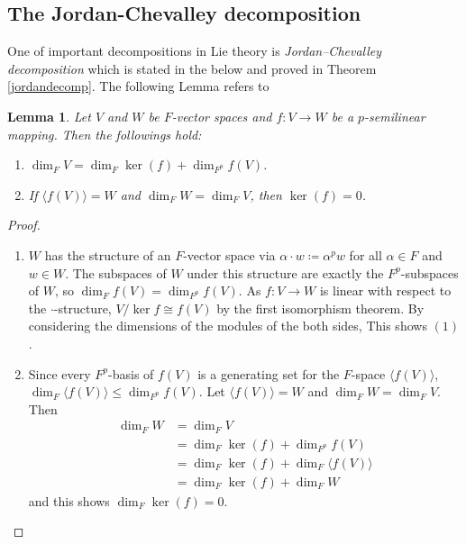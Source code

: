 \documentclass[12pt,MSc]{muthesis_2023}
\theoremstyle{plain}%
\newtheorem{Lemma}[FactCounter]{Lemma} %
\theoremstyle{definition}
\theoremstyle{remark}
\begin{document}
\subsection{The Jordan-Chevalley decomposition}

One of important decompositions in Lie theory is \textit{Jordan–Chevalley decomposition} which is stated in the below and proved in Theorem \ref{jordandecomp}. The following Lemma refers to  \cite[Lemma 2.3.1]{SF}

\begin{Lemma}\label{kerf=0}
Let $V$ and $W$ be $F$-vector spaces and $f:V\rightarrow W$ be a $p$-semilinear mapping. Then the followings hold:
\begin{enumerate}
\item[(1)]
$\dim_F V=\dim_F \ker(f) +\dim_{F^p} f(V)$.
\item[(2)]
If $\langle f(V) \rangle =W$ and $\dim_F W=\dim_F V$, then $\ker(f)=0$.
\end{enumerate}
\end{Lemma}

\begin{proof}
\begin{enumerate}
\item[(1)]
$W$ has the structure of an $F$-vector space via $\alpha \cdot w \coloneqq \alpha^p w$ for all $\alpha\in F$ and $w\in W$. The subspaces of $W$ under this structure are exactly the $F^p$-subspaces of $W$, so $\dim_F f(V)=\dim_{F^p} f(V)$. As $f:V \rightarrow W$ is linear with respect to the $\cdot$-structure, $V/\ker f \cong f(V)$ by the first isomorphism theorem. By considering the dimensions of the modules of the both sides, This shows $(1)$.

\item[(2)]
Since every $F^p$-basis of $f(V)$ is a generating set for the $F$-space $\langle f(V)\rangle$, $\dim_F\langle f(V)\rangle \leq \dim_{F^p} f(V)$. Let $\langle f(V) \rangle =W$ and $\dim_F W=\dim_F V$. Then
\begin{align*}
\dim_F W & = \dim_F V\\
& = \dim _F \ker (f) + \dim_{F^p} f(V) \\
& =\dim_F \ker(f) + \dim_F \langle f(V)\rangle \\
& = \dim_F \ker(f) + \dim_F W
\end{align*}
 and this shows $\dim_F \ker(f)=0$.
\end{enumerate}
\end{proof}
\end{document}
